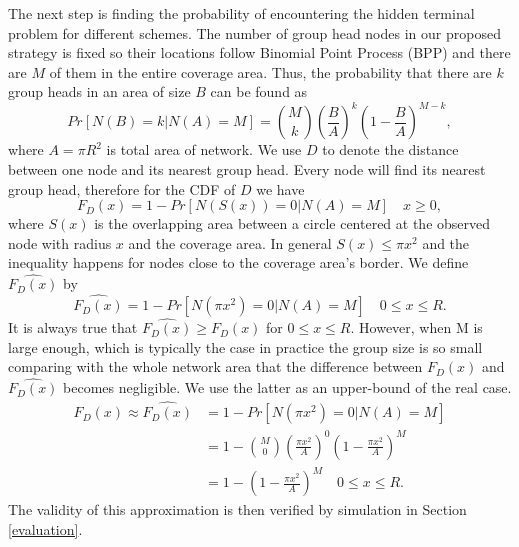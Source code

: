The next step is finding the probability of encountering the hidden terminal problem for different schemes. The number of group head nodes in our proposed strategy is fixed so their locations follow Binomial Point Process (BPP) and there are $M$ of them in the entire coverage area. Thus, the probability that there are $k$ group heads in an area of size $B$ can be found as
\begin{equation}
Pr[ N(B)=k | N(A)=M]={M \choose k} \left( \frac{B}{A} \right)^k \left( 1- \frac{B}{A} \right)^{M-k},
\end{equation}
where $A=\pi R^2$ is total area of network. We use $D$ to denote the distance between one node and its nearest group head. Every node will find its nearest group head, therefore for the CDF of $D$ we have
\begin{equation}
F_D(x)=1-Pr[N(S(x))=0 | N(A)=M] \quad x \geq 0,
\end{equation}
where $S(x)$ is the overlapping area between a circle centered at the observed node with radius $x$ and the coverage area. In general $S(x) \leq \pi x^2$ and the inequality happens for nodes close to the coverage area's border. We define $\hat{F_D(x)}$ by
\begin{equation}
\hat{F_D(x)}=1-Pr[N(\pi x^2)=0 | N(A)=M] \quad 0 \leq x \leq R.
\end{equation}
It is always true that $\hat{F_D(x)} \geq F_D(x)$ for $0 \leq x \leq R$. However, when M is large enough, which is typically the case in practice \cite{zheng2014performance} the group size is so small comparing with the whole network area that the difference between $F_D(x)$ and $\hat{F_D(x)}$ becomes negligible. We use the latter as an upper-bound of the real case.
\begin{equation} \label{eq:cdf}
\begin{split}
F_D(x) \approx \hat{F_D(x)} &=1-Pr[N(\pi x^2)=0 | N(A)=M] \\
&=1- {M \choose 0} \left( \frac{\pi x^2}{A} \right)^0 \left( 1- \frac{\pi x^2}{A} \right)^{M} \\
&=1- \left( 1- \frac{\pi x^2}{A} \right)^{M} \quad 0 \leq x \leq R.
\end{split}
\end{equation}
The validity of this approximation is then verified by simulation in Section \ref{evaluation}.


